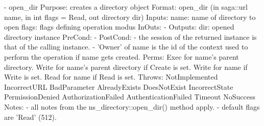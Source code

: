 \begin{myspec}
    - open_dir
      Purpose:  creates a directory object
      Format:   open_dir           (in  saga::url name,
                                    in  int       flags = Read,
                                    out directory dir)
      Inputs:   name:               name of directory to open
                flags:              flags defining operation
                                    modus
      InOuts:   -
      Outputs:  dir:                opened directory instance
      PreCond:  -
      PostCond: - the session of the returned instance is that of
                  the calling instance.
                - 'Owner' of name is the id of the context
                  used to perform the operation if name gets
                  created.
      Perms:    Exec  for name's parent directory.
                Write for name's parent directory if Create is set.
                Write for name if Write is set.
                Read  for name if Read  is set.
      Throws:   NotImplemented
                IncorrectURL
                BadParameter
                AlreadyExists
                DoesNotExist
                IncorrectState
                PermissionDenied
                AuthorizationFailed
                AuthenticationFailed
                Timeout
                NoSuccess
      Notes:    - all notes from the ns_directory::open_dir()
                  method apply.
                - default flags are 'Read' (512).
 

\end{myspec}
